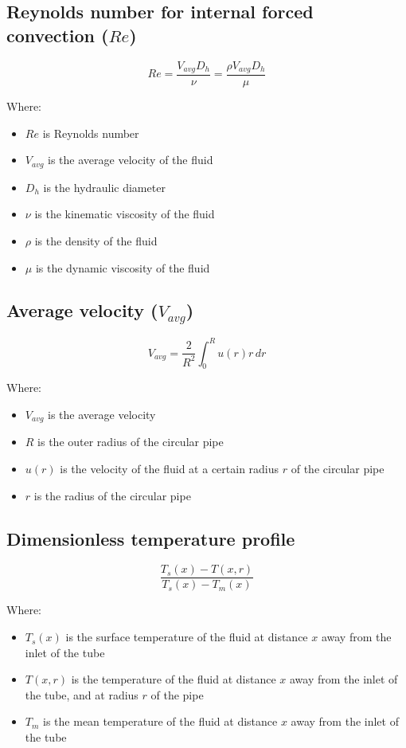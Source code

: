 \documentclass[11pt]{article}
\begin{document}
 \newpage

\subsection{Reynolds number for internal forced convection (\(Re\))}
\label{sec:orge8b0334}
\[Re = \frac{V_{avg} D_h}{\nu} = \frac{\rho V_{avg} D_h}{\mu}\]

Where:
\begin{itemize}
\item \(Re\) is Reynolds number
\item \(V_{avg}\) is the average velocity of the fluid
\item \(D_h\) is the hydraulic diameter
\item \(\nu\) is the kinematic viscosity of the fluid
\item \(\rho\) is the density of the fluid
\item \(\mu\) is the dynamic viscosity of the fluid
\end{itemize}

\subsection{Average velocity (\(V_{avg}\))}
\label{sec:org8b974bb}
\[V_{avg} = \frac{2}{R^2} \int_0^R u(r) r \, dr\]

Where:
\begin{itemize}
\item \(V_{avg}\) is the average velocity
\item \(R\) is the outer radius of the circular pipe
\item \(u(r)\) is the velocity of the fluid at a certain radius \(r\) of the circular pipe
\item \(r\) is the radius of the circular pipe
\end{itemize}

\subsection{Dimensionless temperature profile}
\label{sec:orgc412413}
\[\frac{T_s (x) - T(x, r)}{T_s (x) - T_m (x)}\]

Where:
\begin{itemize}
\item \(T_s(x)\) is the surface temperature of the fluid at distance \(x\) away from the inlet of the tube
\item \(T(x, r)\) is the temperature of the fluid at distance \(x\) away from the inlet of the tube, and at radius \(r\) of the pipe
\item \(T_m\) is the mean temperature of the fluid at distance \(x\) away from the inlet of the tube
\end{itemize}
\end{document}
